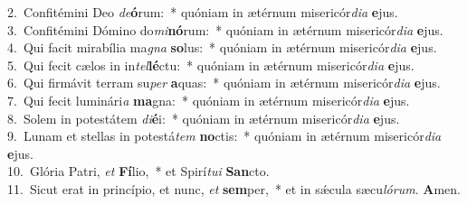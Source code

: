 {2.~}Confitémini Deo \textit{de}\textbf{ó}rum:~* quóniam in ætérnum misericór\textit{di}\textit{a} \textbf{e}jus.\\
{3.~}Confitémini Dómino do\textit{mi}\textbf{nó}rum:~* quóniam in ætérnum misericór\textit{di}\textit{a} \textbf{e}jus.\\
{4.~}Qui facit mirabília ma\textit{gna} \textbf{so}lus:~* quóniam in ætérnum misericór\textit{di}\textit{a} \textbf{e}jus.\\
{5.~}Qui fecit cælos in in\textit{tel}\textbf{lé}ctu:~* quóniam in ætérnum misericór\textit{di}\textit{a} \textbf{e}jus.\\
{6.~}Qui firmávit terram su\textit{per} \textbf{a}quas:~* quóniam in ætérnum misericór\textit{di}\textit{a} \textbf{e}jus.\\
{7.~}Qui fecit luminári\textit{a} \textbf{ma}gna:~* quóniam in ætérnum misericór\textit{di}\textit{a} \textbf{e}jus.\\
{8.~}Solem in potestátem \textit{di}\textbf{é}i:~* quóniam in ætérnum misericór\textit{di}\textit{a} \textbf{e}jus.\\
{9.~}Lunam et stellas in potestá\textit{tem} \textbf{no}ctis:~* quóniam in ætérnum misericór\textit{di}\textit{a} \textbf{e}jus.\\
{10.~}Glória Patri, \textit{et} \textbf{Fí}lio,~* et Spirí\textit{tu}\textit{i} \textbf{San}cto.\\
{11.~}Sicut erat in princípio, et nunc, \textit{et} \textbf{sem}per,~* et in sǽcula sæcu\textit{ló}\textit{rum}. \textbf{A}men.\\
